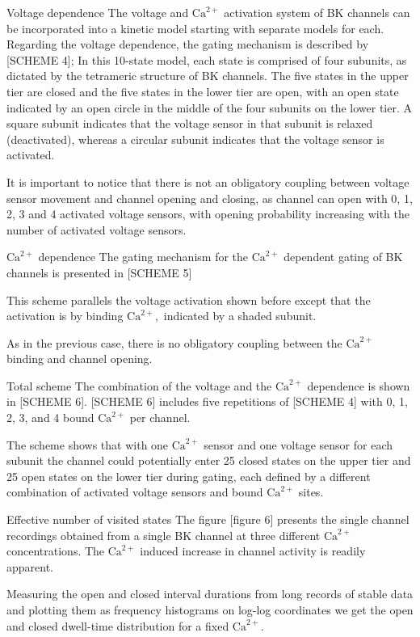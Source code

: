 \documentclass{beamer}
\newcommand{\ca}{\text{Ca}^{2+}}
\begin{document}
\begin{frame}{Voltage dependence}
The voltage and $\ca$ activation system of BK channels can be incorporated into a kinetic model starting with separate models for each.
Regarding the voltage dependence, the gating mechanism is described by [SCHEME 4]; In this 10-state model, each state is comprised of four subunits, as dictated by the tetrameric structure of BK channels.
The five states in the upper tier are closed and the five states in the lower tier are open, with an open state indicated by an open circle in the middle of the four subunits on the lower tier.
A square subunit indicates that the voltage sensor in that subunit is relaxed (deactivated), whereas a circular subunit indicates that the voltage sensor is activated.

It is important to notice that there is not an obligatory coupling between voltage sensor movement and channel opening and closing, as channel can open with 0, 1, 2, 3 and 4 activated voltage sensors, with opening probability increasing with the number of activated voltage sensors.
\end{frame}

\begin{frame}{$\ca$ dependence} 
The gating mechanism for the $\ca$ dependent gating of BK channels is presented in [SCHEME 5]

This scheme parallels the voltage activation shown before except that the activation is by binding $\ca,$ indicated by a shaded subunit.

As in the previous case, there is no obligatory coupling between the $\ca$ binding and channel opening. 

\end{frame}

\begin{frame}{Total scheme}
The combination of the voltage and the $\ca$ dependence is shown in [SCHEME 6].
[SCHEME 6] includes five repetitions of [SCHEME 4] with 0, 1, 2, 3, and 4 bound $\ca$ per channel.

The scheme shows that with one $\ca$ sensor and one voltage sensor for each subunit the channel could potentially enter 25 closed states on the upper tier and 25 open states on the lower tier during gating, each defined by a different combination of activated voltage sensors and bound $\ca$ sites.
\end{frame}

\begin{frame}{Effective number of visited states}
The figure [figure 6] presents the single channel recordings obtained from a single BK channel at three different $\ca$ concentrations.
The $\ca$ induced increase in channel activity is readily apparent.

Measuring the open and closed interval durations from long records of stable data and plotting them as frequency histograms on log-log coordinates we get the open and closed dwell-time distribution for a fixed $\ca.$

\end{frame}
\end{document}
